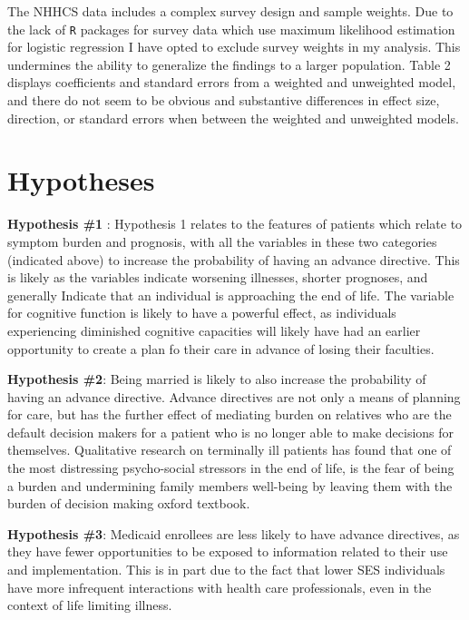 \documentclass{article}
\begin{document}
The NHHCS data includes a complex survey design and sample weights. Due to the lack of \texttt{R} packages for survey data which use maximum likelihood estimation for logistic regression I have opted to exclude survey weights in my analysis. This undermines the ability to generalize the findings to a larger population. Table 2 displays coefficients and standard errors from a weighted and unweighted model, and there do not seem to be obvious and substantive differences in effect size, direction, or standard errors when between the weighted and unweighted models.

\section{Hypotheses}

\textbf{Hypothesis \#1} : Hypothesis 1 relates to the features of patients which relate to symptom burden and prognosis, with all the variables in these two categories (indicated above) to increase the probability of having an advance directive. This is likely as the variables indicate worsening illnesses, shorter prognoses, and generally Indicate that an individual is approaching the end of life. The variable for cognitive function is likely to have a powerful effect, as individuals experiencing diminished cognitive capacities will likely have had an earlier opportunity to create a plan fo their care in advance of losing their faculties. 

\textbf{Hypothesis \#2}: Being married is likely to also increase the probability of having an advance directive. Advance directives are not only a means of planning for care, but has the further effect of mediating burden on relatives who are the default decision makers for a patient who is no longer able to make decisions for themselves. Qualitative research on terminally ill patients has found that one of the most distressing psycho-social stressors in the end of life, is the fear of being a burden and undermining family members well-being by leaving them with the burden of decision making {oxford textbook}. 

\textbf{Hypothesis \#3}: Medicaid enrollees are less likely to have advance directives, as they have fewer opportunities to be exposed to information related to their use and implementation. This is in part due to the fact that lower SES individuals have more infrequent interactions with health care professionals, even in the context of life limiting illness. \cite{carr_is_2016}
\end{document}

